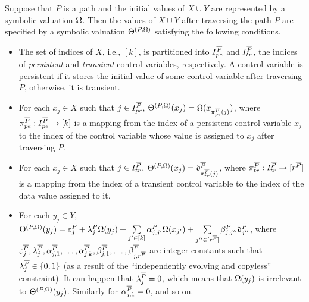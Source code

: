 \begin{proposition}\label{prop-sum-path}
Suppose that $P$ is a path and the initial values of $X \cup Y$ are represented by a symbolic valuation $\Omega$. Then the values of $X \cup Y$ after traversing the path $P$ are specified by a symbolic valuation $\Theta^{(P,\Omega)}$ satisfying the following conditions.
\begin{itemize}
\item The set of indices of $X$, i.e., $[k]$, is partitioned into $I^{\overline{P}}_{pe}$ and $I^{\overline{P}}_{tr}$, the indices of \emph{persistent} and \emph{transient} control variables, respectively. A control variable is persistent if it stores the initial value of some control variable after traversing $P$, otherwise, it is transient.
\item For each $x_j\in X$ such that $j\in I^{\overline{P}}_{pe}$, $\Theta^{(P,\Omega)}(x_j)=\Omega(x_{\pi^{\overline{P}}_{pe}(j)})$, where $\pi^{\overline{P}}_{pe}: I^{\overline{P}}_{pe} \rightarrow [k]$ is a mapping from the index of a persistent control variable $x_j$ to the index of the control variable whose value is assigned to $x_j$ after traversing $P$.
%
\item  For each $x_j\in X$ such that $j\in I^{\overline{P}}_{tr}$,
$\Theta^{(P,\Omega)}(x_j)=\mathfrak{d}^{\overline{P}}_{\pi^{\overline{P}}_{tr}(j)}$, where $\pi^{\overline{P}}_{tr}: I^{\overline{P}}_{tr} \rightarrow [r^{\overline{P}}]$ is a mapping from the index of a transient control variable to the index of the data value assigned to it.
% 
\item For each $y_j \in Y$, 
$
 \Theta^{(P,\Omega)}(y_j)  =
 \varepsilon^{\overline{P}}_{j} + 
 \lambda^{\overline{P}}_j \Omega(y_j)  + 
  \sum\limits_{j'\in [k]}\alpha^{\overline{P}}_{j,j'}\Omega(x_{j'}) +
  \sum\limits_{j''\in [r^{\overline{P}}]}\beta^{\overline{P}}_{j,j''} \mathfrak{d}^{\overline{P}}_{j''}$,
where $\varepsilon^{\overline{P}}_j,\lambda^{\overline{P}}_j, \alpha^{\overline{P}}_{j,1},\dots,\alpha^{\overline{P}}_{j,k}, \beta^{\overline{P}}_{j,1},\dots,\beta^{\overline{P}}_{j,r^{\overline{P}}}$ are integer constants such that $\lambda^{\overline{P}}_{j} \in \{0,1\}$ (as a result of the ``independently evolving and copyless'' constraint).  It can happen that $\lambda^{\overline{P}}_j =0$,  which means that $\Omega(y_j)$ is irrelevant to $\Theta^{(P,\Omega)}(y_j)$. Similarly for $\alpha^{\overline{P}}_{j,1}=0$, and so on.
\end{itemize}
\end{proposition}
